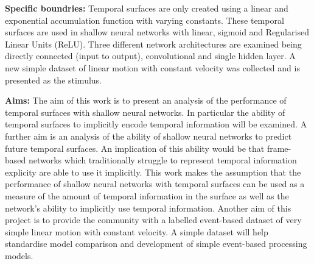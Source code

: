 \textbf{Specific boundries:}
Temporal surfaces are only created using a linear and exponential accumulation function with varying constants.
These temporal surfaces are used in shallow neural networks with linear, sigmoid and Regularised Linear Units (ReLU). 
Three different network architectures are examined being directly connected (input to output), convolutional and single hidden layer. 
A new simple dataset of linear motion with constant velocity was collected and is presented as the stimulus. 

\textbf{Aims:}
The aim of this work is to present an analysis of the performance of temporal surfaces with shallow neural networks.
In particular the ability of temporal surfaces to implicitly encode temporal information will be examined. 
A further aim is an analysis of the ability of shallow neural networks to predict future temporal surfaces.
An implication of this ability would be that frame-based networks which traditionally struggle to represent temporal information explicity are able to use it implicitly. 
This work makes the assumption that the performance of shallow neural networks with temporal surfaces can be used as a measure of the amount of temporal information in the surface as well as the network's ability to implicitly use temporal information. 
Another aim of this project is to provide the community with a labelled event-based dataset of very simple linear motion with constant velocity. 
A simple dataset will help standardise model comparison and development of simple event-based processing models. 


